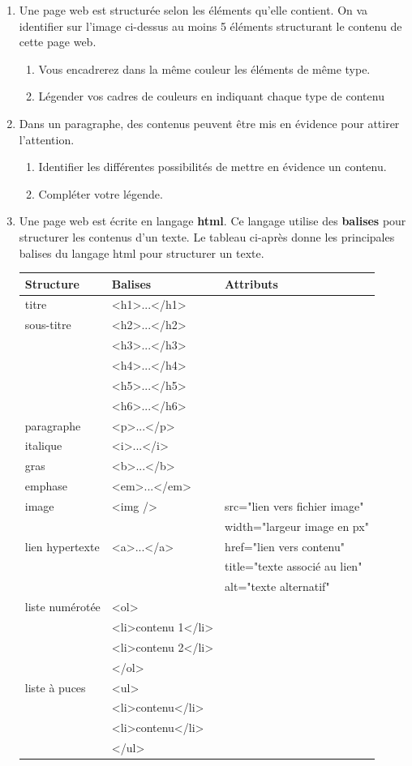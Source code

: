 \documentclass[11pt,a4paper]{article}
\newcounter{num}
\begin{document}
\newpage
\begin{enumerate}
\item Une page web est structurée selon les éléments qu'elle contient. On va identifier sur l'image ci-dessus au moins 5 éléments structurant le contenu de cette page web. 
\begin{enumerate}
\item Vous encadrerez dans la même couleur les éléments de même type.
\item Légender vos cadres de couleurs en indiquant chaque type de contenu
\end{enumerate}

\item Dans un paragraphe, des contenus peuvent être mis en évidence pour attirer l'attention. 
\begin{enumerate}
\item Identifier les différentes possibilités de mettre en évidence un contenu.
\item Compléter votre légende.
\end{enumerate}


\item Une page web est écrite en langage \textbf{html}. Ce langage utilise des \textbf{balises} pour structurer les contenus d'un texte. Le tableau ci-après donne les principales balises du langage html pour structurer un texte.

\begin{center}
\begin{tabular}{|L{3cm}|L{6cm}|L{6cm}|}\hline
\textbf{Structure} & \textbf{Balises} & \textbf{Attributs}\\\hline
titre & <h1>...</h1> & \\
sous-titre & <h2>...</h2> & \\
 & <h3>...</h3> & \\
 & <h4>...</h4> & \\
 & <h5>...</h5> & \\
 & <h6>...</h6> & \\\hline
paragraphe & <p>...</p> & \\\hline
italique & <i>...</i> & \\
gras & <b>...</b> & \\
emphase & <em>...</em> & \\\hline
image & <img /> & src="lien vers fichier image"\\
 &  & width="largeur image en px"\\\hline
lien hypertexte & <a>...</a>& href="lien vers contenu"\\
& & title="texte associé au lien"\\
& & alt="texte alternatif"\\\hline
liste numérotée & <ol>&\\
&<li>contenu 1</li>&\\
&<li>contenu 2</li>&\\
&</ol>&\\\hline
liste à puces & <ul>&\\
&<li>contenu</li>&\\
&<li>contenu</li>&\\
&</ul>&\\\hline
\end{tabular}


\end{center}
\end{enumerate}
\end{document}
